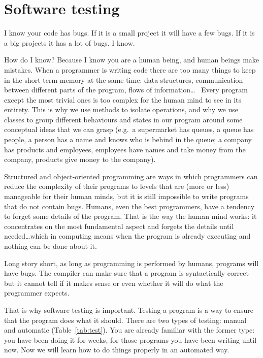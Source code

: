 
\section{Software testing}
\label{sec:software-testing}

I know your code has bugs. If it is a small project it will have a few
bugs. If it is a big projects it has a lot of bugs. I know.

How do I know? Because I know you are a human being, and human beings
make mistakes. When a programmer is writing code there are too
many things to keep in the short-term memory at the same time: data
structures, communication between different parts of the program,
flows of information\ldots ~ Every program except the most trivial ones is
too complex for the human mind to see in its entirety. This is why we
use methods to isolate operations, and
why we use classes to group different behaviours and states in our program
around some conceptual ideas that we can grasp (e.g.~a supermarket has
queues, a queue has people, a person has a name and knows who is
behind in the queue; a company has products and employees, employees
have names and take money from the company, products give money to the
company). 

Structured and object-oriented programming are ways in which
programmers can reduce the complexity of their programs to levels that
are (more or less) manageable for their human minds, 
but it is still impossible to write
programs that do not contain bugs. Humans, even the best programmers,
have a tendency to forget some details of the program. That is the way
the human mind works: it concentrates on the most fundamental aspect
and forgets the details until needed\ldots which in computing means
when the program is already executing and nothing can be done about
it. 

Long story short, as long as programming is performed by humans,
programs will have bugs. The compiler can make sure that a program is
syntactically correct but it cannot tell if  it makes sense or
even whether it will do what the programmer expects. 

That is why software testing is important. Testing a program is a way
to ensure that the program does what it should. There are two types of
testing: manual and automatic (Table~\ref{tab:test}). You are already
familiar with the former type: you have been doing it for weeks, for
those programs you have been writing until now. Now we will learn how to
do things properly in an automated way. 

